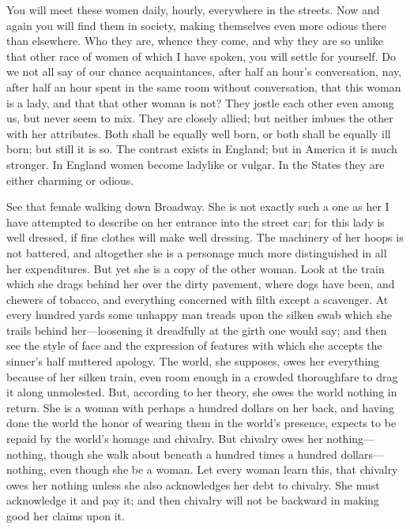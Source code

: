 You will meet these women daily, hourly, everywhere in the streets.
Now and again you will find them in society, making themselves even
more odious there than elsewhere.  Who they are, whence they come,
and why they are so unlike that other race of women of which I have
spoken, you will settle for yourself.  Do we not all say of our
chance acquaintances, after half an hour's conversation, nay, after
half an hour spent in the same room without conversation, that this
woman is a lady, and that that other woman is not?  They jostle
each other even among us, but never seem to mix.  They are closely
allied; but neither imbues the other with her attributes.  Both
shall be equally well born, or both shall be equally ill born; but
still it is so.  The contrast exists in England; but in America it
is much stronger.  In England women become ladylike or vulgar.  In
the States they are either charming or odious.

See that female walking down Broadway.  She is not exactly such a
one as her I have attempted to describe on her entrance into the
street car; for this lady is well dressed, if fine clothes will
make well dressing.  The machinery of her hoops is not battered,
and altogether she is a personage much more distinguished in all
her expenditures.  But yet she is a copy of the other woman.  Look
at the train which she drags behind her over the dirty pavement,
where dogs have been, and chewers of tobacco, and everything
concerned with filth except a scavenger.  At every hundred yards
some unhappy man treads upon the silken swab which she trails
behind her---loosening it dreadfully at the girth one would say; and
then see the style of face and the expression of features with
which she accepts the sinner's half muttered apology.  The world,
she supposes, owes her everything because of her silken train, even
room enough in a crowded thoroughfare to drag it along unmolested.
But, according to her theory, she owes the world nothing in return.
She is a woman with perhaps a hundred dollars on her back, and
having done the world the honor of wearing them in the world's
presence, expects to be repaid by the world's homage and chivalry.
But chivalry owes her nothing---nothing, though she walk about
beneath a hundred times a hundred dollars---nothing, even though she
be a woman.  Let every woman learn this, that chivalry owes her
nothing unless she also acknowledges her debt to chivalry.  She
must acknowledge it and pay it; and then chivalry will not be
backward in making good her claims upon it.

